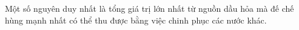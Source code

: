 Một số nguyên duy nhất là tổng giá trị lớn nhất từ nguồn dầu hỏa mà đế chế hùng mạnh nhất có thể thu được bằng việc chinh phục các nước khác.